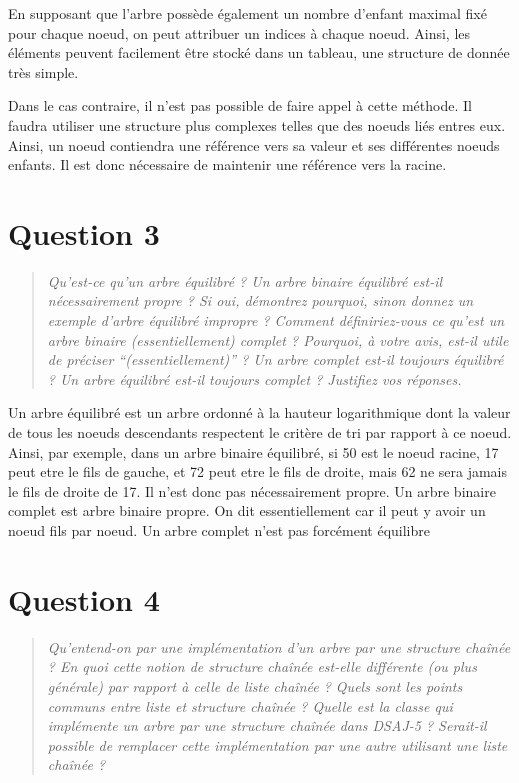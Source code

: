 \documentclass[11pt,a4paper]{article}
\begin{document}
En supposant que l'arbre possède également un nombre d'enfant maximal fixé pour chaque noeud, on peut
attribuer un indices à chaque noeud. Ainsi, les éléments peuvent facilement être stocké dans un tableau,
une structure de donnée très simple.

Dans le cas contraire, il n'est pas possible de faire appel à cette méthode. Il faudra utiliser une structure
plus complexes telles que des noeuds liés entres eux. Ainsi, un noeud contiendra une référence vers sa valeur
et ses différentes noeuds enfants. Il est donc nécessaire de maintenir une référence vers la racine.

\section{Question 3}
\begin{quotation}
\color{gray}\textit{Qu’est-ce qu’un arbre équilibré ? Un arbre binaire équilibré est-il nécessairement
propre ? Si oui, démontrez pourquoi, sinon donnez un exemple d’arbre équilibré
impropre ? Comment définiriez-vous ce qu’est un arbre binaire (essentiellement)
complet ? Pourquoi, à votre avis, est-il utile de préciser “(essentiellement)” ? Un
arbre complet est-il toujours équilibré ? Un arbre équilibré est-il toujours complet ? Justifiez vos réponses.}
\end{quotation}

Un arbre équilibré est un arbre ordonné à la hauteur logarithmique dont la valeur de tous les noeuds descendants respectent le critère
de tri par rapport à ce noeud. Ainsi, par exemple, dans un arbre binaire équilibré,
si 50 est le noeud racine, 17 peut etre le fils de gauche, et 72 peut etre le fils de droite, mais 62 ne sera
jamais le fils de droite de 17. Il n'est donc pas nécessairement propre.
Un arbre binaire complet est arbre binaire propre. On dit essentiellement car il peut y avoir un noeud fils par noeud.
Un arbre complet n'est pas forcément équilibre

\section{Question 4}
\begin{quotation}
\color{gray}\textit{Qu’entend-on par une implémentation d’un arbre par une structure chaînée ? En
quoi cette notion de structure chaînée est-elle différente (ou plus générale) par
rapport à celle de liste chaînée ? Quels sont les points communs entre liste et
structure chaînée ? Quelle est la classe qui implémente un arbre par une structure
chaînée dans DSAJ-5 ? Serait-il possible de remplacer cette implémentation par
une autre utilisant une liste chaînée ?}
\end{quotation}
\end{document}
